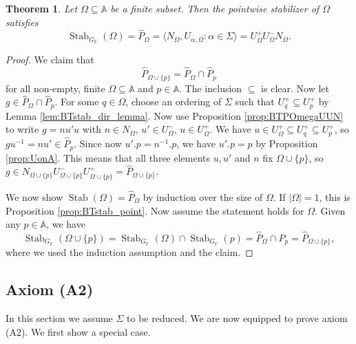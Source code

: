 \documentclass[12pt]{amsart}
\newcommand{\F}{\mathbb{F} }
\newcommand{\A}{\mathbb{A}}
\numberwithin{equation}{section}
\newtheorem{theorem}{Theorem}[section]
\theoremstyle{remark} %
\begin{document}
		\begin{theorem}\label{thm:BTstab_fin}%
			Let $\Omega \subseteq \A$ be a finite subset. Then the pointwise stabilizer of $\Omega$ satisfies
			$$
			\operatorname{Stab}_{G_\F}(\Omega) = \hat{P}_\Omega = \langle N_\Omega, U_{\alpha,\Omega} \colon \alpha \in \Sigma \rangle =  U_\Omega^+ U_\Omega^- N_\Omega.
			$$
		\end{theorem}
		\begin{proof}
			We claim that
			$$
			\hat{P}_{\Omega \cup \{p\}} = \hat{P}_\Omega \cap \hat{P}_p
			$$
			for all non-empty, finite $\Omega \subseteq \A$ and $p \in \A$. The inclusion $\subseteq$ is clear. Now let $g \in \hat{P}_\Omega \cap \hat{P}_p$. For some $q \in \Omega$, choose an ordering of $\Sigma$ such that $U_q^+ \subseteq U_p^+$ by Lemma \ref{lem:BTstab_dir_lemma}. 
			Now use Proposition \ref{prop:BTPOmegaUUN} to write $g = nu'u$ with $n \in N_{\Omega}$, $u' \in U_{\Omega}^-$, $u\in U_{\Omega}^+$. We have $u \in U_{\Omega}^+ \subseteq U_{q}^+ \subseteq U_{p}^+$, so $gu^{-1} = nu' \in \hat{P}_p$. Since now $u'.p = n^{-1}.p$, we have $u'.p = p$ by Proposition \ref{prop:UonA}. This means that all three elements $u, u'$ and $n$ fix $\Omega \cup \{p\}$, so $g \in N_{\Omega \cup \{p\}} U_{\Omega \cup \{p\}}^- U_{\Omega \cup \{p\}}^+ = \hat{P}_{\Omega \cup \{p\}}$. 
			
			We now show $\operatorname{Stab}(\Omega) = \hat{P}_{\Omega} $ by induction over the size of $\Omega$. If $|\Omega|=1$, this is Proposition \ref{prop:BTstab_point}. Now assume the statement holds for $\Omega$. Given any $p\in \A$, we have
			$$
			\operatorname{Stab}_{G_\F}(\Omega \cup \{p\}) = \operatorname{Stab}_{G_\F}(\Omega) \cap \operatorname{Stab}_{G_\F}(p) 
			= \hat{P}_\Omega \cap \hat{P}_p = \hat{P}_{\Omega \cup \{p\}},
			$$
			where we used the induction assumption and the claim.
		\end{proof}
		
\subsection{Axiom (A2)} \label{sec:A2_subsubsection}
		
		In this section we assume $\Sigma$ to be reduced. We are now equipped to prove axiom (A2). We first show a special case.
		
\end{document}
